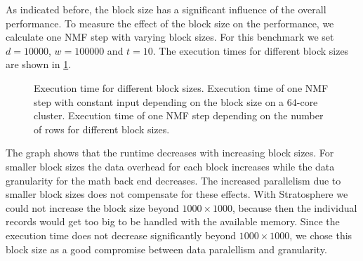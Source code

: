As indicated before, the block size has a significant influence of the overall performance.
To measure the effect of the block size on the performance, we calculate one NMF step with varying block sizes.
For this benchmark we set $d=10000$, $w = 100000$ and $t = 10$.
The execution times for different block sizes are shown in \cref{fig:blocksizesNMFStep}.

\begin{figure}
	\centering
	\begin{subfigure}{\dualpgfwidth}
		\caption{}
		\label{fig:blocksizesNMFStep}
	\end{subfigure}
	\begin{subfigure}{\dualpgfwidth}
		\caption{}
		\label{fig:nmfStepDifferentBlocksizes}
	\end{subfigure}
	\caption{Execution time for different block sizes.  Execution time of one NMF step with constant input depending on the block size on a $64$-core cluster.  Execution time of one NMF step depending on the number of rows for different block sizes.}
	\label{fig:blocksizes}
\end{figure}

The graph shows that the runtime decreases with increasing block sizes.
For smaller block sizes the data overhead for each block increases while the data granularity for the math back end decreases.
The increased parallelism due to smaller block sizes does not compensate for these effects.
With Stratosphere we could not increase the block size beyond $1000\times 1000$, because then the individual records would get too big to be handled with the available memory.
Since the execution time does not decrease significantly beyond $1000\times 1000$, we chose this block size as a good compromise between data paralellism and granularity.

